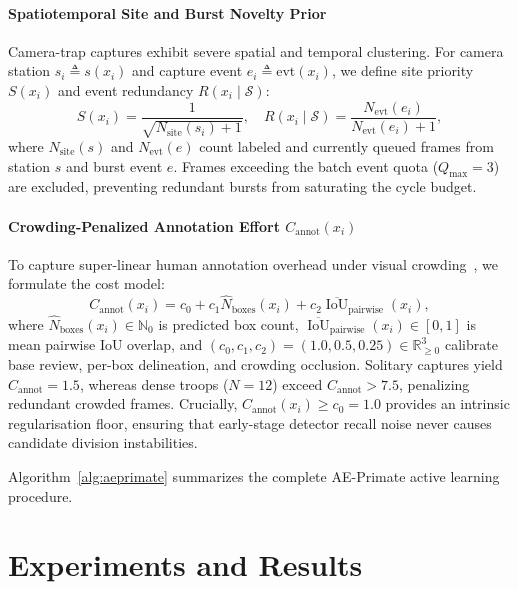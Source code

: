 \documentclass[conference]{IEEEtran}
\begin{document}
\paragraph{Spatiotemporal Site and Burst Novelty Prior}
Camera-trap captures exhibit severe spatial and temporal clustering. For camera station $s_i \triangleq s(x_i)$ and capture event $e_i \triangleq \text{evt}(x_i)$, we define site priority $S(x_i)$ and event redundancy $R(x_i \mid \mathcal{S})$:
\begin{equation}
  S(x_i) = \frac{1}{\sqrt{N_{\text{site}}(s_i) + 1}}, \quad R(x_i \mid \mathcal{S}) = \frac{N_{\text{evt}}(e_i)}{N_{\text{evt}}(e_i) + 1},
  \label{eq:meta}
\end{equation}
where $N_{\text{site}}(s)$ and $N_{\text{evt}}(e)$ count labeled and currently queued frames from station $s$ and burst event $e$. Frames exceeding the batch event quota ($Q_{\max}=3$) are excluded, preventing redundant bursts from saturating the cycle budget.

\paragraph{Crowding-Penalized Annotation Effort $C_{\text{annot}}(x_i)$}
To capture super-linear human annotation overhead under visual crowding~\cite{papadopoulos2017training,su2012crowdsourcing}, we formulate the cost model:
\begin{equation}
  C_{\text{annot}}(x_i) = c_0 + c_1 \hat{N}_{\text{boxes}}(x_i) + c_2 \overline{\operatorname{IoU}}_{\text{pairwise}}(x_i),
  \label{eq:cost}
\end{equation}
where $\hat{N}_{\text{boxes}}(x_i) \in \mathbb{N}_0$ is predicted box count, $\overline{\operatorname{IoU}}_{\text{pairwise}}(x_i) \in [0, 1]$ is mean pairwise IoU overlap, and $(c_0, c_1, c_2) = (1.0, 0.5, 0.25) \in \mathbb{R}_{\ge 0}^3$ calibrate base review, per-box delineation, and crowding occlusion. Solitary captures yield $C_{\text{annot}} = 1.5$, whereas dense troops ($N=12$) exceed $C_{\text{annot}} > 7.5$, penalizing redundant crowded frames. Crucially, $C_{\text{annot}}(x_i) \ge c_0 = 1.0$ provides an intrinsic regularisation floor, ensuring that early-stage detector recall noise never causes candidate division instabilities.

Algorithm~\ref{alg:aeprimate} summarizes the complete AE-Primate active learning procedure.

\section{Experiments and Results}
\end{document}
